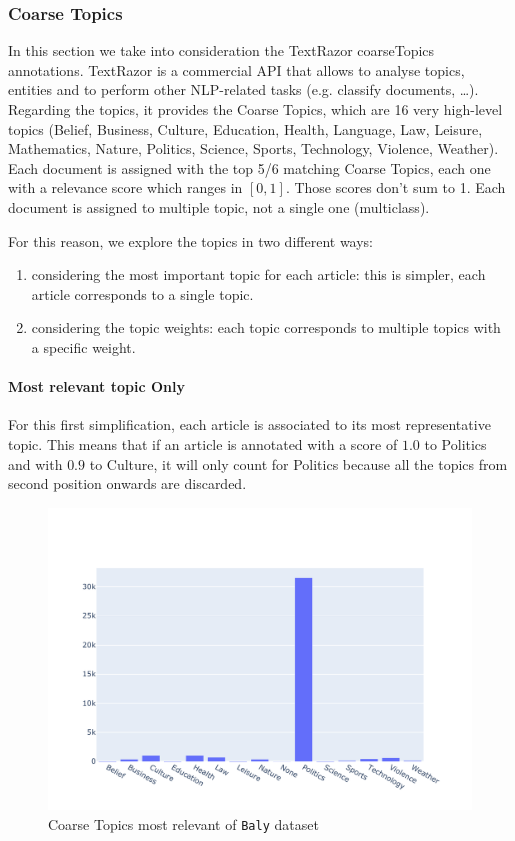 \subsubsection{\statusgreen Coarse Topics}

In this section we take into consideration the TextRazor coarseTopics annotations. TextRazor is a commercial API that allows to analyse topics, entities and to perform other NLP-related tasks (e.g. classify documents, …).
Regarding the topics, it provides the Coarse Topics, which are 16 very high-level topics (Belief, Business, Culture, Education, Health, Language, Law, Leisure, Mathematics, Nature, Politics, Science, Sports, Technology, Violence, Weather).
Each document is assigned with the top 5/6 matching Coarse Topics, each one with a relevance score which ranges in $[0,1]$. Those scores don’t sum to 1. Each document is assigned to multiple topic, not a single one (multiclass).

For this reason, we explore the topics in two different ways:

\begin{enumerate}
    \item considering the most important topic for each article: this is simpler, each article corresponds to a single topic.
    \item considering the topic weights: each topic corresponds to multiple topics with a specific weight.
\end{enumerate}

\paragraph{Most relevant topic Only}

For this first simplification, each article is associated to its most representative topic. This means that if an article is annotated with a score of $1.0$ to Politics and with $0.9$ to Culture, it will only count for Politics because all the topics from second position onwards are discarded.


\begin{figure}[!htbp]
    \centering
    \includegraphics[width=\linewidth]{figures/baly_coarse_first.pdf}
    \caption{Coarse Topics most relevant of \texttt{Baly} dataset}
    \label{fig:baly_coarse_first}
\end{figure}

